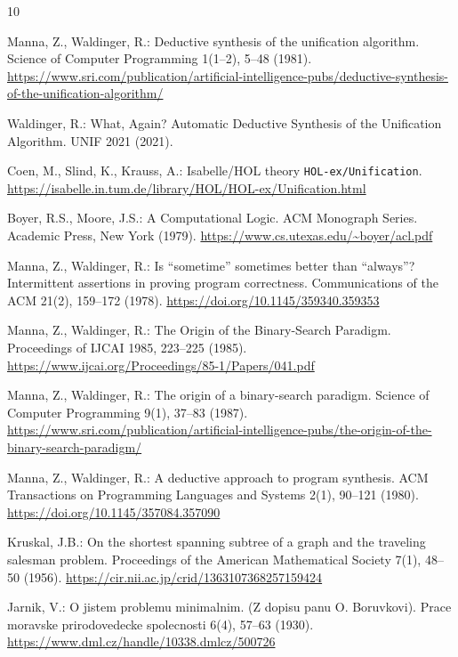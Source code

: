 \documentclass[runningheads]{llncs}
\begin{document}
\begin{thebibliography}{10}

Manna, Z., Waldinger, R.:
Deductive synthesis of the unification algorithm.
Science of Computer Programming 1(1--2), 5--48 (1981).
\url{https://www.sri.com/publication/artificial-intelligence-pubs/deductive-synthesis-of-the-unification-algorithm/}

Waldinger, R.:
What, Again? Automatic Deductive Synthesis of the Unification Algorithm.
UNIF 2021 (2021).

Coen, M., Slind, K., Krauss, A.:
Isabelle/HOL theory \texttt{HOL-ex/Unification}.
\url{https://isabelle.in.tum.de/library/HOL/HOL-ex/Unification.html}

Boyer, R.S., Moore, J.S.:
A Computational Logic.
ACM Monograph Series. Academic Press, New York (1979).
\url{https://www.cs.utexas.edu/~boyer/acl.pdf}

Manna, Z., Waldinger, R.:
Is ``sometime'' sometimes better than ``always''? Intermittent assertions in
proving program correctness.
Communications of the ACM 21(2), 159--172 (1978).
\url{https://doi.org/10.1145/359340.359353}

Manna, Z., Waldinger, R.:
The Origin of the Binary-Search Paradigm.
Proceedings of IJCAI 1985, 223--225 (1985).
\url{https://www.ijcai.org/Proceedings/85-1/Papers/041.pdf}

Manna, Z., Waldinger, R.:
The origin of a binary-search paradigm.
Science of Computer Programming 9(1), 37--83 (1987).
\url{https://www.sri.com/publication/artificial-intelligence-pubs/the-origin-of-the-binary-search-paradigm/}

Manna, Z., Waldinger, R.:
A deductive approach to program synthesis.
ACM Transactions on Programming Languages and Systems 2(1), 90--121 (1980).
\url{https://doi.org/10.1145/357084.357090}

Kruskal, J.B.:
On the shortest spanning subtree of a graph and the traveling salesman problem.
Proceedings of the American Mathematical Society 7(1), 48--50 (1956).
\url{https://cir.nii.ac.jp/crid/1363107368257159424}

Jarnik, V.:
O jistem problemu minimalnim. (Z dopisu panu O. Boruvkovi).
Prace moravske prirodovedecke spolecnosti 6(4), 57--63 (1930).
\url{https://www.dml.cz/handle/10338.dmlcz/500726}


\end{thebibliography}
\end{document}
